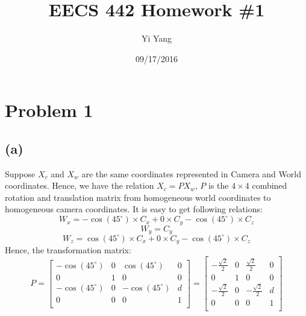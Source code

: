 \documentclass[letterpaper]{article}
\author{Yi Yang}
\title{EECS 442 Homework \#1}
\begin{document}
\date{09/17/2016}
\maketitle

\newcommand{\trace}{\mathrm{trace}}
\newcommand{\real}{\mathbb R}  %
\newcommand{\nat}{\mathbb N}   %
\newcommand{\cp}{\mathbb C}    %
\newcommand{\ds}{\displaystyle}
\newcommand{\mf}[2]{\frac{\ds #1}{\ds #2}}
\newcommand{\spanof}[1]{\textrm{span} \{ #1 \}}
\newcommand{\sol}[0]{\textbf{Solution: }}
\newcommand{\pf}[0]{\textbf{Proof:}}
\newcommand{\rme}[0]{\textrm{e}}
\newcommand{\Null}[1]{\textrm{Null}\{#1\}}
\parindent 0pt
\section*{Problem 1}
\subsection*{(a)}
Suppose $X_c$ and $X_w$ are the same coordinates represented in Camera and World coordinates. Hence, we have the relation $X_c = PX_w$, $P$ is the $4\times4$ combined rotation and translation matrix from homogeneous world coordinates to homogeneous camera coordinates. It is easy to get following relations:
$$W_x = -\cos(45^{\circ})\times C_x + 0\times C_y - \cos(45^{\circ})\times C_z$$
$$W_y = C_y$$
$$W_z = \cos(45^{\circ})\times C_x + 0\times C_y - \cos(45^{\circ})\times C_z$$
Hence, the transformation matrix:\\
$$ P = 
\begin{bmatrix}
	    -\cos(45^{\circ}) & 0 & \cos(45^{\circ}) & 0\\
		0 & 1 & 0 & 0\\
		-\cos(45^{\circ}) & 0 & -\cos(45^{\circ}) & d\\
		0 & 0 & 0 & 1\\
\end{bmatrix}
=
\begin{bmatrix}
		-\mf{\sqrt{2}}{2} & 0 & \mf{\sqrt{2}}{2} & 0\\
		0 & 1 & 0 & 0\\
		-\mf{\sqrt{2}}{2} & 0 & -\mf{\sqrt{2}}{2} & d\\
		0 & 0 & 0 & 1\\
\end{bmatrix}
$$
\end{document}
